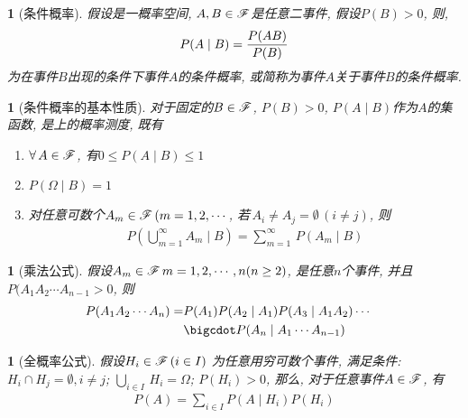 \newtheorem{conditional_probability}[theorem_root]{}
\begin{conditional_probability}[条件概率]
假设\prbsp 是一概率空间, \(A, B\in\msF\)是任意二事件, 假设\(P(B) > 0\), 则,
\begin{align}
    P(A\mid B) = {P(AB)\over P(B)}
\end{align}
为在事件\(B\)出现的条件下事件\(A\)的条件概率, 或简称为事件\(A\)关于事件\(B\)的条件概率.
\end{conditional_probability}

\newtheorem{basic_properties_of__}[theorem_root]{\remark}
\begin{basic_properties_of__}[条件概率的基本性质]
对于固定的\(B\in\msF\), \(P(B)>0\), \(P(A\mid B)\)作为\(A\)的集函数, 是\msF 上的概率测度, 既有
\begin{enumerate}
    \item \(\forall\,A\in\msF\), 有\(0\le P(A\mid B) \le 1\)
    \item \(P(\Omega\mid B) = 1\)
    \item 对任意可数个\(A_m\in\msF\,(m= 1, 2, \cdots\), 若\(\,A_i\ne A_j = \emptyset\, (i\ne j)\), 则
    \begin{align}
        P\left(\bigcup\limits_{m=1}^\infty A_m \mid  B\right) = \sum\limits_{m=1}^\infty\,P(A_m\mid B)
    \end{align}
\end{enumerate}
\end{basic_properties_of__}

\newtheorem{addition_formula}[theorem_root]{\theorem}
\begin{addition_formula}[乘法公式]
假设\(A_m\in\msF\,m = 1, 2, \cdots, n(n\ge 2)\), 是任意\(n\)个事件, 并且\(P(A_1A_2\cdots A_{n-1}>0\), 则
\begin{align}
    P(A_1A_2\cdots A_n) = &P(A_1)P(A_2\mid A_1)P(A_3\mid A_1A_2)\cdots\cr
                          &\bigcdot P(A_n\mid A_1\cdots A_{n-1})
\end{align}
\end{addition_formula}

\newtheorem{full_probability_formula}[theorem_root]{\theorem}
\begin{full_probability_formula}[全概率公式]
    假设\(H_i\in\msF\,(i\in I)\) 为任意用穷可数个事件, 满足条件:
    \(H_i\cap H_j = \emptyset, i\ne j\); \(\bigcup\limits_{i\in I}\,H_i = \Omega\); 
    \(P(H_i) > 0\), 那么, 对于任意事件\(A\in\msF\), 有
    \begin{align}
        P(A) = \sum\limits_{i\in I}P(A\mid H_i) P(H_i)
    \end{align}
\end{full_probability_formula}

